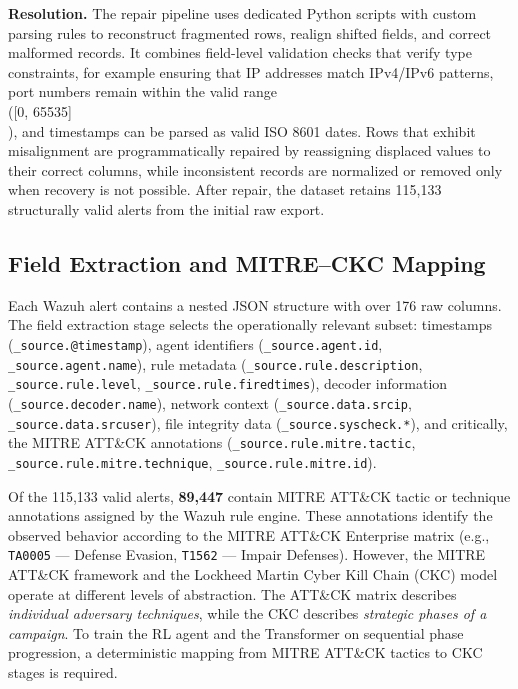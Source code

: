 \textbf{Resolution.} The repair pipeline uses dedicated Python scripts with custom parsing rules to reconstruct fragmented rows, realign shifted fields, and correct malformed records. It combines field-level validation checks that verify type constraints, for example ensuring that IP addresses match IPv4/IPv6 patterns, port numbers remain within the valid range \\([0, 65535]\\), and timestamps can be parsed as valid ISO 8601 dates. Rows that exhibit misalignment are programmatically repaired by reassigning displaced values to their correct columns, while inconsistent records are normalized or removed only when recovery is not possible. After repair, the dataset retains 115,133 structurally valid alerts from the initial raw export.

\subsection{Field Extraction and MITRE--CKC Mapping}
\label{subsec:mitre_ckc_mapping}

Each Wazuh alert contains a nested JSON structure with over 176 raw columns. The field extraction stage selects the operationally relevant subset: timestamps (\texttt{\_source.@timestamp}), agent identifiers (\texttt{\_source.agent.id}, \texttt{\_source.agent.name}), rule metadata (\texttt{\_source.rule.description}, \texttt{\_source.rule.level}, \texttt{\_source.rule.firedtimes}), decoder information (\texttt{\_source.decoder.name}), network context (\texttt{\_source.data.srcip}, \texttt{\_source.data.srcuser}), file integrity data (\texttt{\_source.syscheck.*}), and critically, the MITRE ATT\&CK annotations (\texttt{\_source.rule.mitre.tactic}, \texttt{\_source.rule.mitre.technique}, \texttt{\_source.rule.mitre.id}).

Of the 115,133 valid alerts, \textbf{89,447} contain MITRE ATT\&CK tactic or technique annotations assigned by the Wazuh rule engine. These annotations identify the observed behavior according to the MITRE ATT\&CK Enterprise matrix (e.g., \texttt{TA0005} --- Defense Evasion, \texttt{T1562} --- Impair Defenses). However, the MITRE ATT\&CK framework and the Lockheed Martin Cyber Kill Chain (CKC) model operate at different levels of abstraction. The ATT\&CK matrix describes \textit{individual adversary techniques}, while the CKC describes \textit{strategic phases of a campaign}. To train the RL agent and the Transformer on sequential phase progression, a deterministic mapping from MITRE ATT\&CK tactics to CKC stages is required.

